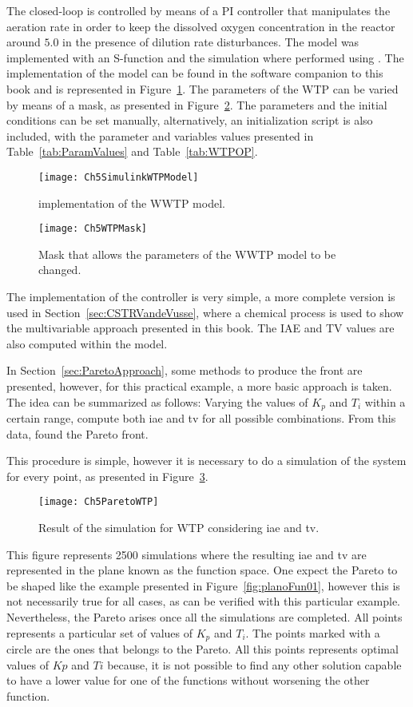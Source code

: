 The closed-loop is controlled by means of a PI controller that manipulates the aeration rate in order to keep the dissolved oxygen concentration in the reactor around $5.0$ in the presence of dilution rate disturbances. The model was implemented with an S-function and the simulation where performed using \simulink. The implementation of the model can be found in the software companion to this book and is represented in Figure~\ref{fig:Ch5SimulinkWTPModel}. The parameters of the WTP can be varied by means of a mask, as presented in Figure~\ref{fig:Ch5WTPMask}. The parameters and the initial conditions can be set manually, alternatively, an initialization script is also included, with the parameter and variables values presented in Table~\ref{tab:ParamValues} and Table~\ref{tab:WTPOP}.
%
\begin{figure}[tb]
	\centering
	\texttt{[image: Ch5SimulinkWTPModel]}
	\caption{\simulink implementation of the WWTP model.}
	\label{fig:Ch5SimulinkWTPModel}
\end{figure}
%
\begin{figure}[tb]
	\centering
	\texttt{[image: Ch5WTPMask]}
	\caption{Mask that allows the parameters of the WWTP model to be changed.}
	\label{fig:Ch5WTPMask}
\end{figure}

The implementation of the controller is very simple, a more complete version is used in Section~\ref{sec:CSTRVandeVusse}, where a chemical process is used to show the multivariable approach presented in this book. The IAE and TV values are also computed within the \simulink model.

In Section~\ref{sec:ParetoApproach}, some methods to produce the front are presented, however, for this practical example, a more basic approach is taken. The idea can be summarized as follows: Varying the values of $K_p$ and $T_i$ within a certain range, compute both \gls{iae} and \gls{tv} for all possible combinations. From this data, found the Pareto front.

This procedure is simple, however it is necessary to do a simulation of the system for every point, as presented in Figure~\ref{fig:Ch5ParetoWTP}. %
\begin{figure}
	\centering
	\texttt{[image: Ch5ParetoWTP]}
	\caption{Result of the simulation for WTP considering \gls{iae} and \gls{tv}.}
	\label{fig:Ch5ParetoWTP}
\end{figure}
%
This figure represents 2500 simulations where the resulting \gls{iae} and \gls{tv} are represented in the plane known as the function space. One expect the Pareto to be shaped like the example presented in Figure~\ref{fig:planoFun01}, however this is not necessarily true for all cases, as can be verified with this particular example. Nevertheless, the Pareto arises once all the simulations are completed. All points represents a particular set of values of $K_p$ and $T_i$. The points marked with a circle are the ones that belongs to the Pareto. All this points represents optimal values of $Kp$ and $Ti$ because, it is not possible to find any other solution capable to have a lower value for one of the functions without worsening the other function.

